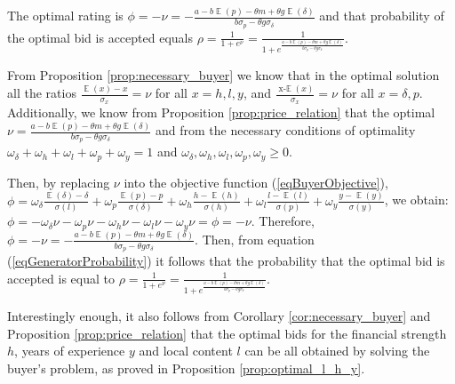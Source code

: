 \documentclass[informs]{informs3}
\begin{document}
\begin{proposition}\label{prop:optimal_bid}
The optimal rating is $\phi=-\nu =-\frac{a-b \mathop{\mathbb{E}}\left(p\right)-\theta m+\theta g \mathop{\mathbb{E}}\left(\delta\right)}{b\sigma_{p}-\theta g\sigma_{\delta}}$ and that probability of the optimal bid is accepted equals $\rho=\frac{1}{1+e^{\nu}}=\frac{1}{1+e^{\frac{a-b \mathop{\mathbb{E}}\left(p\right)-\theta m+\theta g \mathop{\mathbb{E}}\left(\delta\right)}{b\sigma_{p}-\theta g\sigma_{\delta}}  }}$.

\end{proposition}
%
From Proposition \ref{prop:necessary_buyer} we know that in the optimal solution all the ratios $\frac{\mathop{\mathbb{E}}\left(x\right)-x}{\sigma_{x}} = \nu$ for all $x = {h, l, y}$, and $\frac{\mathop{x-\mathbb{E}}\left(x\right)}{\sigma_{x}} = \nu$ for all $x = {\delta, p}$. Additionally, we know from Proposition \ref{prop:price_relation} that the optimal $\nu =\frac{a-b \mathop{\mathbb{E}}\left(p\right)-\theta m+\theta g \mathop{\mathbb{E}}\left(\delta\right)}{b\sigma_{p}-\theta g\sigma_{\delta}}$ and from the necessary conditions of optimality 
$\omega_{\delta}+\omega_{h}+\omega_{l}+\omega_{p}+\omega_{y}=1 $ and 		
$\omega_{\delta},\omega_{h},\omega_{l},\omega_{p},\omega_{y} \geq 0$. 

Then, by replacing $\nu$ into the objective function (\ref{eqBuyerObjective}), 
$\phi=\omega_{\delta}\frac{\mathop{\mathbb{E}}\left(\delta\right)-\delta }
{\sigma\left(l\right)}+\omega_{p}\frac{\mathop{\mathbb{E}}\left(p\right)-p}  {\sigma\left(\delta\right)} 
+\omega_{h}\frac{ h-\mathop{\mathbb{E}}\left(h\right)}
{\sigma\left(h\right)}+\omega_{l}\frac{ l-\mathop{\mathbb{E}}\left(l\right) }{\sigma\left(p\right)}+\omega_{y}\frac{y-\mathop{\mathbb{E}}\left(y\right)}{\sigma\left(y\right)}$, we obtain:
$\phi=-\omega_{\delta}\nu-\omega_{p}\nu 
-\omega_{h}\nu-\omega_{l}\nu-\omega_{y}\nu = \phi=-\nu$. Therefore, 
$\phi=-\nu =-\frac{a-b \mathop{\mathbb{E}}\left(p\right)-\theta m+\theta g \mathop{\mathbb{E}}\left(\delta\right)}{b\sigma_{p}-\theta g\sigma_{\delta}}$.  Then, from equation (\ref{eqGeneratorProbability}) it follows that the probability that the optimal bid is accepted is equal to  
$\rho=\frac{1}{1+e^{\nu}}=\frac{1}{1+e^{\frac{a-b \mathop{\mathbb{E}}\left(p\right)-\theta m+\theta g \mathop{\mathbb{E}}\left(\delta\right)}{b\sigma_{p}-\theta g\sigma_{\delta}}  }}$.\Halmos
\endproof


Interestingly enough, it also follows from Corollary \ref{cor:necessary_buyer} and Proposition \ref{prop:price_relation} that the optimal bids for the financial strength $h$, years of experience $y$ and local content $l$ can be all obtained by solving the buyer's problem, as proved in Proposition \ref{prop:optimal_l_h_y}.
\end{document}
